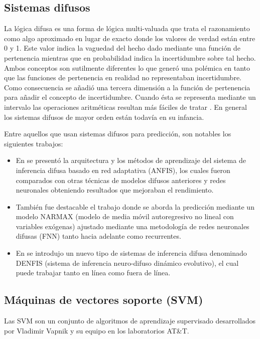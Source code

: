 \documentclass{llncs}
\begin{document}
\subsection{Sistemas difusos}
La lógica difusa es una forma de lógica multi-valuada que trata el razonamiento como algo aproximado en lugar de exacto donde los valores de verdad están entre 0 y 1. Este valor indica la vaguedad del hecho dado mediante una función de pertenencia mientras que en probabilidad indica la incertidumbre sobre tal hecho. Ambos conceptos son sutilmente diferentes lo que generó una polémica en tanto que las funciones de pertenencia en realidad no representaban incertidumbre. Como consecuencia se añadió una tercera dimensión a la función de pertenencia para añadir el concepto de incertidumbre. Cuando ésta se representa mediante un intervalo las operaciones aritméticas resultan más fáciles de tratar \cite{liang2000interval}. En general los sistemas difusos de mayor orden están todavía en su infancia.

Entre aquellos que usan sistemas difusos para predicción, son notables los siguientes trabajos:

\begin{itemize}

\item En \cite{jang1993anfis} se presentó la arquitectura y los métodos de aprendizaje del sistema de inferencia difusa basado en red adaptativa (ANFIS), los cuales fueron comparados con otras técnicas de modelos difusos anteriores y redes neuronales obteniendo resultados que mejoraban el rendimiento.

\item También fue destacable el trabajo \cite{gao2005narmax}  donde se aborda la predicción mediante un modelo NARMAX (modelo de media móvil autoregresivo no lineal con variables exógenas) ajustado mediante una metodología de redes neuronales difusas (FNN) tanto hacia adelante como recurrentes.

\item En \cite{kasabov2002denfis} se introdujo un nuevo tipo de sistemas de inferencia difusa denominado DENFIS (sistema de inferencia neuro-difuso dinámico evolutivo), el cual puede trabajar tanto en línea como fuera de línea.

\end{itemize}

\subsection{Máquinas de vectores soporte (SVM)}
Las SVM son un conjunto de algoritmos de aprendizaje supervisado desarrollados por Vladimir Vapnik y su equipo en los laboratorios AT\&T.
\end{document}
